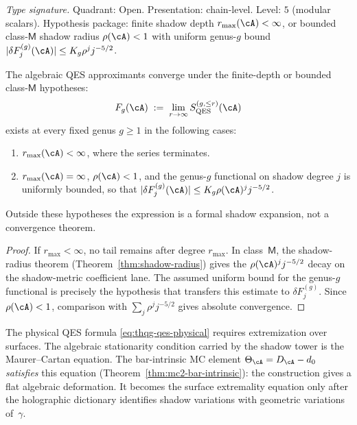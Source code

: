 \begin{theorem}
\label{thm:thqg-qes-convergence}
\textit{Type signature.}
Quadrant: Open. Presentation: chain-level. Level: $5$ (modular scalars).
Hypothesis package: finite shadow depth $r_{\max}(\cA) < \infty$, or
bounded class-$\mathsf M$ shadow radius $\rho(\cA) < 1$ with uniform
genus-$g$ bound $|\delta F^{(g)}_j(\cA)| \le K_g\rho^j j^{-5/2}$.

\medskip
The algebraic QES approximants converge under the finite-depth or
bounded class-$\mathsf M$ hypotheses:
\[
F_g(\cA)
\;:=\;
\lim_{r \to \infty}
S_{\mathrm{QES}}^{(g, \le r)}(\cA)
\]
exists at every fixed genus $g\ge1$ in the following cases:
\begin{enumerate}[label=\textup{(\roman*)}]
\item $r_{\max}(\cA)<\infty$, where the series terminates.
\item $r_{\max}(\cA)=\infty$, $\rho(\cA)<1$, and the genus-$g$
 functional on shadow degree $j$ is uniformly bounded, so that
 $|\delta F^{(g)}_j(\cA)| \le K_g\rho(\cA)^j j^{-5/2}$.
\end{enumerate}
Outside these hypotheses the expression is a formal shadow expansion,
not a convergence theorem.
\end{theorem}

\begin{proof}
If $r_{\max}<\infty$, no tail remains after degree $r_{\max}$.  In
class~$\mathsf M$, the shadow-radius theorem
(Theorem~\ref{thm:shadow-radius}) gives the
$\rho(\cA)^j j^{-5/2}$ decay on the shadow-metric coefficient lane.
The assumed uniform bound for the genus-$g$ functional is precisely
the hypothesis that transfers this estimate to
$\delta F^{(g)}_j$.  Since $\rho(\cA)<1$, comparison with
$\sum_j\rho^j j^{-5/2}$ gives absolute convergence.
\end{proof}

\begin{remark}
\label{rem:thqg-mc-as-extremization}
The physical QES formula \eqref{eq:thqg-qes-physical} requires
extremization over surfaces.  The algebraic stationarity condition
carried by the shadow tower is the Maurer--Cartan equation.
The bar-intrinsic MC element $\Theta_\cA = D_\cA - d_0$
\emph{satisfies} this equation
(Theorem~\ref{thm:mc2-bar-intrinsic}):
the construction gives a flat algebraic deformation.  It becomes the
surface extremality equation only after the holographic dictionary
identifies shadow variations with geometric variations of~$\gamma$.
\end{remark}

